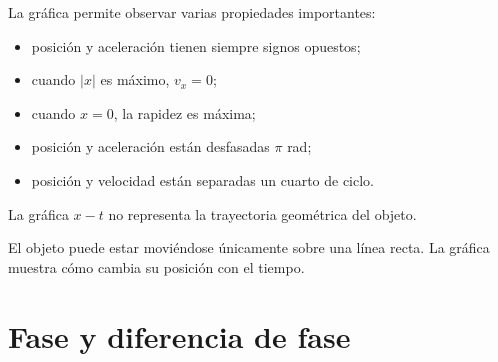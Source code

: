 \begin{center}
\end{center}

La gráfica permite observar varias propiedades importantes:

\begin{itemize}
    \item posición y aceleración tienen siempre signos opuestos;
    \item cuando \(|x|\) es máximo, \(v_x=0\);
    \item cuando \(x=0\), la rapidez es máxima;
    \item posición y aceleración están desfasadas \(\pi\) rad;
    \item posición y velocidad están separadas un cuarto de ciclo.
\end{itemize}

\begin{errorfrecuente}
La gráfica \(x-t\) no representa la trayectoria geométrica del objeto.

El objeto puede estar moviéndose únicamente sobre una línea recta. La gráfica muestra cómo cambia su posición con el tiempo.
\end{errorfrecuente}

\section{Fase y diferencia de fase}


